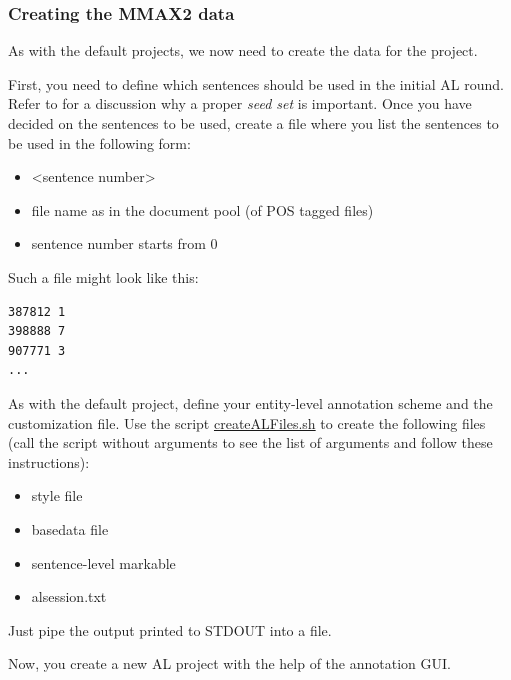 \documentclass[DIV12,english,11pt,halfparskip]{scrartcl}
\begin{document}
\begin{appendix}
\subsubsection{Creating the MMAX2 data}

As with the default projects, we now need to create the data for the
project.

First, you need to define which sentences should be used in the
initial AL round. Refer to \cite{Tomanek2007law} for a discussion why
a proper \emph{seed set} is important. Once you have decided on the
sentences to be used, create a file where you list the sentences to be
used in the following form:

\begin{itemize}
\item <file name> <sentence number>
\item file name as in the document pool (of POS tagged files)
\item sentence number starts from 0
\end{itemize}

Such a file might look like this:
\begin{verbatim}
387812 1
398888 7
907771 3
...
\end{verbatim}

As with the default project, define your entity-level annotation
scheme and the customization file. Use the script
\url{createALFiles.sh} to create the following files (call the script
without arguments to see the list of arguments and follow these
instructions):
\begin{itemize}
\item style file
\item basedata file
\item sentence-level markable
\item alsession.txt
\end{itemize}

Just pipe the output printed to STDOUT into a file.

Now, you create a new AL project with the help of the annotation GUI.


\end{appendix}



\end{document}
